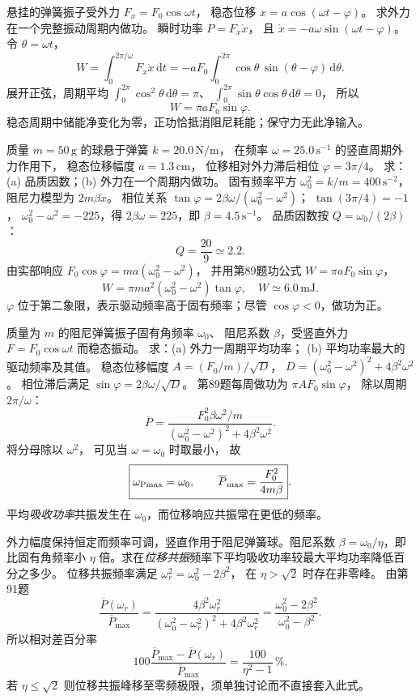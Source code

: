 悬挂的弹簧振子受外力
$F_x=F_0\cos\omega t$，
稳态位移
$x=a\cos(\omega t-\varphi)$。
求外力在一个完整振动周期内做功。
\exsolution
瞬时功率 $P=F_x\dot x$，
且 $\dot x=-a\omega\sin(\omega t-\varphi)$。
令 $\theta=\omega t$，
\[
W=\int_0^{2\pi/\omega}F_x\dot x\,\mathrm dt
=-aF_0\int_0^{2\pi}\cos\theta\,
\sin(\theta-\varphi)\,\mathrm d\theta.
\]
展开正弦，周期平均
$\int_0^{2\pi}\cos^2\theta\,\mathrm d\theta=\pi$、
$\int_0^{2\pi}\sin\theta\cos\theta\,\mathrm d\theta=0$，
所以
\[
\boxed{W=\pi aF_0\sin\varphi}.
\]
\excheck 稳态周期中储能净变化为零，正功恰抵消阻尼耗能；保守力无此净输入。

质量 $m=50\,\mathrm g$ 的球悬于弹簧
$k=20.0\,\mathrm{N/m}$，
在频率 $\omega=25.0\,\mathrm{s^{-1}}$ 的竖直周期外力作用下，
稳态位移幅度 $a=1.3\,\mathrm{cm}$，
位移相对外力滞后相位 $\varphi=3\pi/4$。
求：(a) 品质因数；(b) 外力在一个周期内做功。
\exsolution
固有频率平方
$\omega_0^2=k/m=400\,\mathrm{s^{-2}}$，
阻尼力模型为 $2m\beta\dot x$。
相位关系
$\tan\varphi=2\beta\omega/(\omega_0^2-\omega^2)$；
$\tan(3\pi/4)=-1$，
$\omega_0^2-\omega^2=-225$，得
$2\beta\omega=225$，即
$\beta=4.5\,\mathrm{s^{-1}}$。
品质因数按 $Q=\omega_0/(2\beta)$：
\[
\boxed{Q=\frac{20}{9}\simeq2.2}.
\]
由实部响应
$F_0\cos\varphi=m a(\omega_0^2-\omega^2)$，
并用第89题功公式
$W=\pi aF_0\sin\varphi$，
\[
W=\pi m a^2(\omega_0^2-\omega^2)\tan\varphi,
\quad
\boxed{W\simeq6.0\,\mathrm{mJ}}.
\]
\excheck $\varphi$ 位于第二象限，表示驱动频率高于固有频率；尽管 $\cos\varphi<0$，做功为正。

质量为 $m$ 的阻尼弹簧振子固有角频率 $\omega_0$、
阻尼系数 $\beta$，受竖直外力
$F=F_0\cos\omega t$ 而稳态振动。
求：(a) 外力一周期平均功率；
(b) 平均功率最大的驱动频率及其值。
\exsolution
稳态位移幅度
$A=(F_0/m)/\sqrt{D}$，
$D=(\omega_0^2-\omega^2)^2+4\beta^2\omega^2$。
相位滞后满足
$\sin\varphi=2\beta\omega/\sqrt D$。
第89题每周做功为 $\pi AF_0\sin\varphi$，
除以周期 $2\pi/\omega$：
\[
\boxed{\overline P=
\frac{F_0^2\beta\omega^2/m}
{(\omega_0^2-\omega^2)^2+4\beta^2\omega^2}}.
\]
将分母除以 $\omega^2$，
可见当 $\omega=\omega_0$ 时取最小，
故
\[
\boxed{\omega_{\rm Pmax}=\omega_0,\qquad
\overline P_{\max}=\frac{F_0^2}{4m\beta}}.
\]
\excheck 平均\emph{吸收功率}共振发生在 $\omega_0$，而位移响应共振常在更低的频率。

外力幅度保持恒定而频率可调，竖直作用于阻尼弹簧球。阻尼系数 $\beta=\omega_0/\eta$，即比固有角频率小 $\eta$ 倍。求在\emph{位移共振}频率下平均吸收功率较最大平均功率降低百分之多少。
\exsolution
位移共振频率满足
$\omega_r^2=\omega_0^2-2\beta^2$，
在 $\eta>\sqrt2$ 时存在非零峰。
由第91题
\[
\frac{\overline P(\omega_r)}{\overline P_{\max}}
=\frac{4\beta^2\omega_r^2}
{(\omega_0^2-\omega_r^2)^2+4\beta^2\omega_r^2}
=\frac{\omega_0^2-2\beta^2}{\omega_0^2-\beta^2}.
\]
所以相对差百分率
\[
\boxed{
100\frac{\overline P_{\max}-\overline P(\omega_r)}
{\overline P_{\max}}
=\frac{100}{\eta^2-1}\,\%}.
\]
\excheck 若 $\eta\le\sqrt2$ 则位移共振峰移至零频极限，须单独讨论而不直接套入此式。

